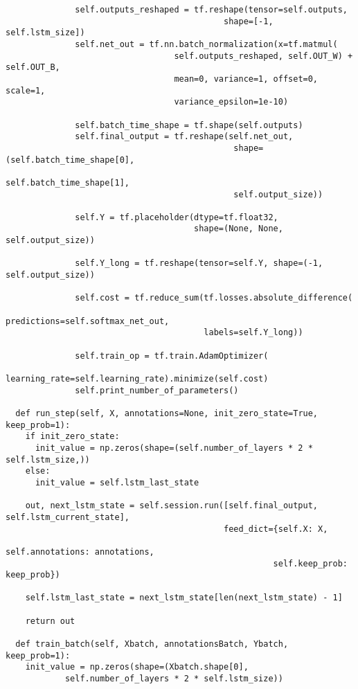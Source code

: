 \begin{latin}
\begin{verbatim}
              self.outputs_reshaped = tf.reshape(tensor=self.outputs, 
                                            shape=[-1, self.lstm_size])
              self.net_out = tf.nn.batch_normalization(x=tf.matmul(
                                  self.outputs_reshaped, self.OUT_W) + self.OUT_B,
                                  mean=0, variance=1, offset=0, scale=1,
                                  variance_epsilon=1e-10)

              self.batch_time_shape = tf.shape(self.outputs)
              self.final_output = tf.reshape(self.net_out, 
                                              shape=(self.batch_time_shape[0],
                                              self.batch_time_shape[1],
                                              self.output_size))

              self.Y = tf.placeholder(dtype=tf.float32,
                                      shape=(None, None, self.output_size))

              self.Y_long = tf.reshape(tensor=self.Y, shape=(-1, self.output_size))

              self.cost = tf.reduce_sum(tf.losses.absolute_difference(
                                        predictions=self.softmax_net_out,
                                        labels=self.Y_long))

              self.train_op = tf.train.AdamOptimizer(
                              learning_rate=self.learning_rate).minimize(self.cost)
              self.print_number_of_parameters()

  def run_step(self, X, annotations=None, init_zero_state=True, keep_prob=1):
    if init_zero_state:
      init_value = np.zeros(shape=(self.number_of_layers * 2 * self.lstm_size,))
    else:
      init_value = self.lstm_last_state

    out, next_lstm_state = self.session.run([self.final_output, self.lstm_current_state],
                                            feed_dict={self.X: X,
                                                      self.annotations: annotations,
                                                      self.keep_prob: keep_prob})

    self.lstm_last_state = next_lstm_state[len(next_lstm_state) - 1]

    return out

  def train_batch(self, Xbatch, annotationsBatch, Ybatch, keep_prob=1):
    init_value = np.zeros(shape=(Xbatch.shape[0], 
            self.number_of_layers * 2 * self.lstm_size))


\end{verbatim}
\end{latin}
